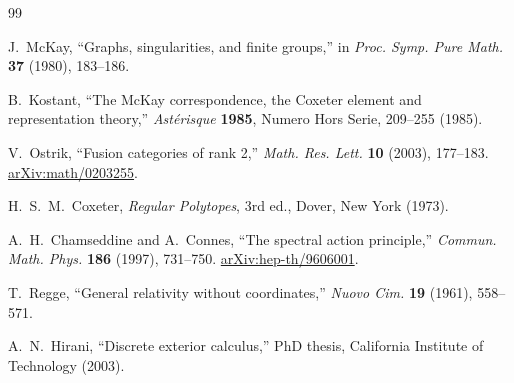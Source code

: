 \documentclass[12pt,a4paper]{article}
\theoremstyle{definition}
\begin{document}
\begin{thebibliography}{99}

J.~McKay, ``Graphs, singularities, and finite groups,'' in \textit{Proc. Symp. Pure Math.} \textbf{37} (1980), 183--186.

B.~Kostant, ``The McKay correspondence, the Coxeter element and representation theory,'' \textit{Ast\'erisque} \textbf{1985}, Numero Hors Serie, 209--255 (1985).

V.~Ostrik, ``Fusion categories of rank 2,'' \textit{Math. Res. Lett.} \textbf{10} (2003), 177--183. \href{https://arxiv.org/abs/math/0203255}{arXiv:math/0203255}.

H.~S.~M.~Coxeter, \textit{Regular Polytopes}, 3rd ed., Dover, New York (1973).

A.~H.~Chamseddine and A.~Connes, ``The spectral action principle,'' \textit{Commun. Math. Phys.} \textbf{186} (1997), 731--750. \href{https://arxiv.org/abs/hep-th/9606001}{arXiv:hep-th/9606001}.

T.~Regge, ``General relativity without coordinates,'' \textit{Nuovo Cim.} \textbf{19} (1961), 558--571.

A.~N.~Hirani, ``Discrete exterior calculus,'' PhD thesis, California Institute of Technology (2003).

\end{thebibliography}
\end{document}
